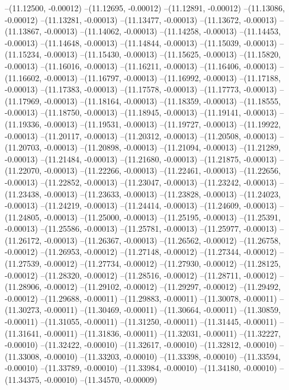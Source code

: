 --(11.12500, -0.00012)
--(11.12695, -0.00012)
--(11.12891, -0.00012)
--(11.13086, -0.00012)
--(11.13281, -0.00013)
--(11.13477, -0.00013)
--(11.13672, -0.00013)
--(11.13867, -0.00013)
--(11.14062, -0.00013)
--(11.14258, -0.00013)
--(11.14453, -0.00013)
--(11.14648, -0.00013)
--(11.14844, -0.00013)
--(11.15039, -0.00013)
--(11.15234, -0.00013)
--(11.15430, -0.00013)
--(11.15625, -0.00013)
--(11.15820, -0.00013)
--(11.16016, -0.00013)
--(11.16211, -0.00013)
--(11.16406, -0.00013)
--(11.16602, -0.00013)
--(11.16797, -0.00013)
--(11.16992, -0.00013)
--(11.17188, -0.00013)
--(11.17383, -0.00013)
--(11.17578, -0.00013)
--(11.17773, -0.00013)
--(11.17969, -0.00013)
--(11.18164, -0.00013)
--(11.18359, -0.00013)
--(11.18555, -0.00013)
--(11.18750, -0.00013)
--(11.18945, -0.00013)
--(11.19141, -0.00013)
--(11.19336, -0.00013)
--(11.19531, -0.00013)
--(11.19727, -0.00013)
--(11.19922, -0.00013)
--(11.20117, -0.00013)
--(11.20312, -0.00013)
--(11.20508, -0.00013)
--(11.20703, -0.00013)
--(11.20898, -0.00013)
--(11.21094, -0.00013)
--(11.21289, -0.00013)
--(11.21484, -0.00013)
--(11.21680, -0.00013)
--(11.21875, -0.00013)
--(11.22070, -0.00013)
--(11.22266, -0.00013)
--(11.22461, -0.00013)
--(11.22656, -0.00013)
--(11.22852, -0.00013)
--(11.23047, -0.00013)
--(11.23242, -0.00013)
--(11.23438, -0.00013)
--(11.23633, -0.00013)
--(11.23828, -0.00013)
--(11.24023, -0.00013)
--(11.24219, -0.00013)
--(11.24414, -0.00013)
--(11.24609, -0.00013)
--(11.24805, -0.00013)
--(11.25000, -0.00013)
--(11.25195, -0.00013)
--(11.25391, -0.00013)
--(11.25586, -0.00013)
--(11.25781, -0.00013)
--(11.25977, -0.00013)
--(11.26172, -0.00013)
--(11.26367, -0.00013)
--(11.26562, -0.00012)
--(11.26758, -0.00012)
--(11.26953, -0.00012)
--(11.27148, -0.00012)
--(11.27344, -0.00012)
--(11.27539, -0.00012)
--(11.27734, -0.00012)
--(11.27930, -0.00012)
--(11.28125, -0.00012)
--(11.28320, -0.00012)
--(11.28516, -0.00012)
--(11.28711, -0.00012)
--(11.28906, -0.00012)
--(11.29102, -0.00012)
--(11.29297, -0.00012)
--(11.29492, -0.00012)
--(11.29688, -0.00011)
--(11.29883, -0.00011)
--(11.30078, -0.00011)
--(11.30273, -0.00011)
--(11.30469, -0.00011)
--(11.30664, -0.00011)
--(11.30859, -0.00011)
--(11.31055, -0.00011)
--(11.31250, -0.00011)
--(11.31445, -0.00011)
--(11.31641, -0.00011)
--(11.31836, -0.00011)
--(11.32031, -0.00011)
--(11.32227, -0.00010)
--(11.32422, -0.00010)
--(11.32617, -0.00010)
--(11.32812, -0.00010)
--(11.33008, -0.00010)
--(11.33203, -0.00010)
--(11.33398, -0.00010)
--(11.33594, -0.00010)
--(11.33789, -0.00010)
--(11.33984, -0.00010)
--(11.34180, -0.00010)
--(11.34375, -0.00010)
--(11.34570, -0.00009)
